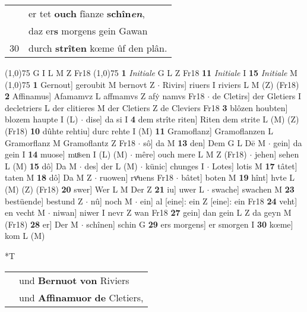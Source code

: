 \documentclass[8pt,a4paper,notitlepage]{article}
\begin{document}
\begin{table}[ht]
\begin{minipage}[t]{0.5\linewidth}
\begin{tabular}{rl}
 & er tet \textbf{ouch} fîanze \textbf{schîn\textit{en}},\\ 
 & daz er\textbf{s} morgens gein Gawan\\ 
30 & durch \textbf{strîten} kœme ûf den plân.\\ 
\end{tabular}
\scriptsize
\line(1,0){75} \newline
G I L M Z Fr18 \newline
\line(1,0){75} \newline
\textbf{1} \textit{Initiale} G L Z Fr18  \textbf{11} \textit{Initiale} I  \textbf{15} \textit{Initiale} M  \newline
\line(1,0){75} \newline
\textbf{1} Gernout] geroubit M bernovt Z  $\cdot$ Rivirs] riuers I riviers L M (Z) (Fr18) \textbf{2} Affinamus] Afamamvz L affmamvs Z afẏ namvs Fr18  $\cdot$ de Cletirs] der Gletiers I decletriers L der clitieres M der Cletiers Z de Cleviers Fr18 \textbf{3} blôzen houbten] blozem haupte I (L)  $\cdot$ dise] da si I \textbf{4} dem strîte riten] Riten dem strite L (M) (Z) (Fr18) \textbf{10} dûhte rehtiu] durc rehte I (M) \textbf{11} Gramoflanz] Gramoflanzen L Gramorflanz M Gramoflantz Z Fr18  $\cdot$ sô] da M \textbf{13} den] Dem G L Dē M  $\cdot$ gein] da gein I \textbf{14} muose] muͦsen I (L) (M)  $\cdot$ mêre] ouch mere L M Z (Fr18)  $\cdot$ jehen] sehen L (M) \textbf{15} dô] Da M  $\cdot$ des] der L (M)  $\cdot$ künic] chunges I  $\cdot$ Lotes] lotis M \textbf{17} tâtet] taten M \textbf{18} dô] Da M Z  $\cdot$ ruowen] rvͦuens Fr18  $\cdot$ bâtet] boten M \textbf{19} hînt] hvte L (M) (Z) (Fr18) \textbf{20} swer] Wer L M Der Z \textbf{21} iu] uwer L  $\cdot$ swache] swachen M \textbf{23} bestüende] bestund Z  $\cdot$ nû] noch M  $\cdot$ ein] al [eine]: ein Z [eine]: ein Fr18 \textbf{24} veht] en vecht M  $\cdot$ niwan] niwer I nevr Z wan Fr18 \textbf{27} gein] dan gein L Z da geyn M (Fr18) \textbf{28} er] Der M  $\cdot$ schînen] schin G \textbf{29} ers morgens] er smorgen I \textbf{30} kœme] kom L (M) \newline
\end{minipage}
\hspace{0.5cm}
\begin{minipage}[t]{0.5\linewidth}
\small
\begin{center}*T
\end{center}
\begin{tabular}{rl}
 & und \textbf{Bernuot} \textbf{von} Riviers\\ 
 & und \textbf{Affinamuor} \textbf{de} Cletiers,\\ 

\end{tabular}
\end{minipage}
\end{table}
\end{document}
